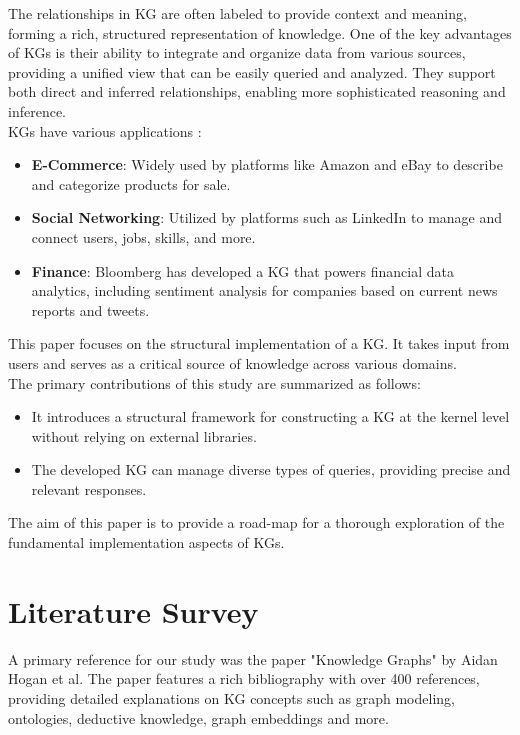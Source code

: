 \documentclass[conference]{IEEEtran}
\begin{document}
The relationships in KG are often labeled to provide context and meaning, forming a rich, structured representation of knowledge.
One of the key advantages of KGs is their ability to integrate and organize data from various sources, providing a unified view that can be easily queried and analyzed. They support both direct and inferred relationships, enabling more sophisticated reasoning and inference.
\\KGs have various applications : 
\begin{itemize}
    \item \textbf{E-Commerce}: Widely used by platforms like Amazon\cite{b2, b3} and eBay\cite{b4} to describe and categorize products for sale.
    \item \textbf{Social Networking}: Utilized by platforms such as LinkedIn\cite{b5} to manage and connect users, jobs, skills, and more.
    \item \textbf{Finance}: Bloomberg\cite{b6} has developed a KG that powers financial data analytics, including sentiment analysis for companies based on current news reports and tweets.
\end{itemize}

This paper focuses on the structural implementation of a KG. It takes input from users and serves as a critical source of knowledge across various domains. 
\\
The primary contributions of this study are summarized as follows:

\begin{itemize}
    \item It introduces a structural framework for constructing a KG at the kernel level without relying on external libraries.
    \item The developed KG can manage diverse types of queries, providing precise and relevant responses.
\end{itemize}

The aim of this paper is to provide a road-map for a thorough exploration of the fundamental implementation aspects of KGs.


\section{Literature Survey}

A primary reference for our study was the paper "Knowledge Graphs"\cite{b8} by Aidan Hogan et al. The paper features a rich bibliography with over 400 references, providing detailed explanations on KG concepts such as graph modeling, ontologies, deductive knowledge, graph embeddings and more. 
\end{document}
